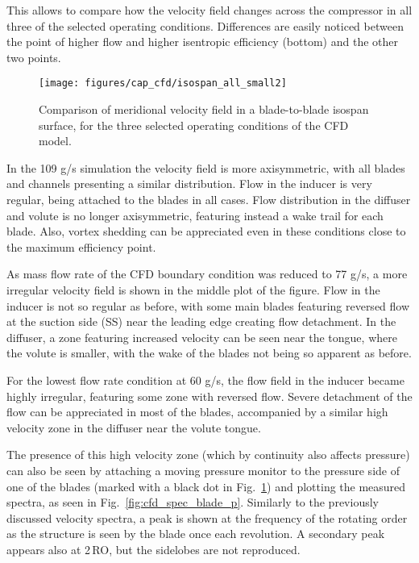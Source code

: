 This allows to compare how the velocity field changes across the compressor in all three of the selected operating conditions. Differences are easily noticed between the point of higher flow and higher isentropic efficiency (bottom) and the other two points. 

\begin{figure}[htpb!]
\centering
\texttt{[image: figures/cap\_cfd/isospan\_all\_small2]}
\caption{Comparison of meridional velocity field in a blade-to-blade isospan surface, for the three selected operating conditions of the CFD model.}
\label{fig:cfd_isospan_all}
\end{figure}

In the 109 g/s simulation the velocity field is more axisymmetric, with all blades and channels presenting a similar distribution. Flow in the inducer is very regular, being attached to the blades in all cases. Flow distribution in the diffuser and volute is no longer axisymmetric, featuring instead a wake trail for each blade. Also, vortex shedding can be appreciated even in these conditions close to the maximum efficiency point.

As mass flow rate of the CFD boundary condition was reduced to 77 g/s, a more irregular velocity field is shown in the middle plot of the figure. Flow in the inducer is not so regular as before, with some main blades featuring reversed flow at the suction side (SS) near the leading edge creating flow detachment. In the diffuser, a zone featuring increased velocity can be seen near the tongue, where the volute is smaller, with the wake of the blades not being so apparent as before.

For the lowest flow rate condition at 60 g/s, the flow field in the inducer became highly irregular, featuring some zone with reversed flow. Severe detachment of the flow can be appreciated in most of the blades, accompanied by a similar high velocity zone in the diffuser near the volute tongue. 

The presence of this high velocity zone (which by continuity also affects pressure) can also be seen by attaching a moving pressure monitor to the pressure side of one of the blades (marked with a black dot in Fig.~\ref{fig:cfd_isospan_all}) and plotting the measured spectra, as seen in Fig.~\ref{fig:cfd_spec_blade_p}. Similarly to the previously discussed velocity spectra, a peak is shown at the frequency of the rotating order as the structure is seen by the blade once each revolution. A secondary peak appears also at 2\,RO, but the sidelobes are not reproduced.

